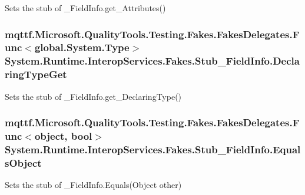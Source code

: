 Sets the stub of \-\_\-\-Field\-Info.\-get\-\_\-\-Attributes()

\hypertarget{class_system_1_1_runtime_1_1_interop_services_1_1_fakes_1_1_stub___field_info_a3118dbaf08eb06b3e59f0ccaca50a81c}{
\subsubsection[{Declaring\-Type\-Get}]{\setlength{\rightskip}{0pt plus 5cm}mqttf.\-Microsoft.\-Quality\-Tools.\-Testing.\-Fakes.\-Fakes\-Delegates.\-Func$<$global.\-System.\-Type$>$ System.\-Runtime.\-Interop\-Services.\-Fakes.\-Stub\-\_\-\-Field\-Info.\-Declaring\-Type\-Get}}\label{class_system_1_1_runtime_1_1_interop_services_1_1_fakes_1_1_stub___field_info_a3118dbaf08eb06b3e59f0ccaca50a81c}


Sets the stub of \-\_\-\-Field\-Info.\-get\-\_\-\-Declaring\-Type()

\hypertarget{class_system_1_1_runtime_1_1_interop_services_1_1_fakes_1_1_stub___field_info_af1f5051ec3d26937da1b6565ac16c1a7}{
\subsubsection[{Equals\-Object}]{\setlength{\rightskip}{0pt plus 5cm}mqttf.\-Microsoft.\-Quality\-Tools.\-Testing.\-Fakes.\-Fakes\-Delegates.\-Func$<$object, bool$>$ System.\-Runtime.\-Interop\-Services.\-Fakes.\-Stub\-\_\-\-Field\-Info.\-Equals\-Object}}\label{class_system_1_1_runtime_1_1_interop_services_1_1_fakes_1_1_stub___field_info_af1f5051ec3d26937da1b6565ac16c1a7}


Sets the stub of \-\_\-\-Field\-Info.\-Equals(\-Object other)


